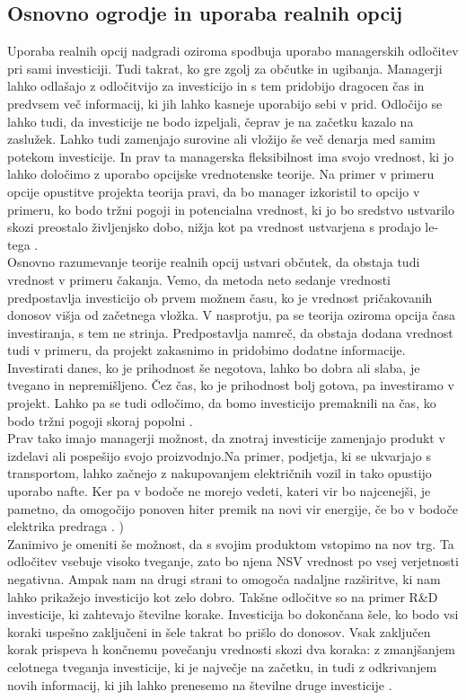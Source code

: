 \documentclass[12pt, a4paper]{amsart}
\theoremstyle{definition} %
\theoremstyle{plain} %
\begin{document}
\subsection{Osnovno ogrodje in uporaba realnih opcij}
Uporaba realnih opcij nadgradi oziroma spodbuja uporabo managerskih odločitev pri sami investiciji. Tudi takrat, ko gre zgolj za občutke in ugibanja. Managerji lahko odlašajo z odločitvijo za investicijo in s tem pridobijo dragocen čas in predvsem več informacij, ki jih lahko kasneje uporabijo sebi v prid. Odločijo se lahko tudi, da investicije ne bodo izpeljali, čeprav je na začetku kazalo na zaslužek. Lahko tudi zamenjajo surovine ali vložijo še več denarja med samim potekom investicije. In prav ta managerska fleksibilnost ima svojo vrednost, ki jo lahko določimo z uporabo opcijske vrednotenske teorije. Na primer v primeru opcije opustitve projekta teorija pravi, da bo manager izkoristil to opcijo v primeru, ko bodo tržni pogoji in potencialna vrednost, ki jo bo sredstvo ustvarilo skozi preostalo življenjsko dobo, nižja kot pa vrednost ustvarjena s prodajo le-tega \cite[str. 33]{Brach}.  \\

Osnovno razumevanje teorije realnih opcij ustvari občutek, da obstaja tudi vrednost v primeru čakanja. Vemo, da metoda neto sedanje vrednosti predpostavlja investicijo ob prvem možnem času, ko je vrednost pričakovanih donosov višja od začetnega vložka. V nasprotju, pa se teorija oziroma opcija časa investiranja, s tem ne strinja. Predpostavlja namreč, da obstaja dodana vrednost tudi v primeru, da projekt zakasnimo in pridobimo dodatne informacije. Investirati danes, ko je prihodnost še negotova, lahko bo dobra ali slaba, je tvegano in nepremišljeno. Čez čas, ko je prihodnost bolj gotova, pa investiramo v projekt. Lahko pa se tudi odločimo, da bomo investicijo premaknili na čas, ko bodo tržni pogoji skoraj popolni \cite[str. 34, 35]{Brach}. \\

Prav tako imajo managerji možnost, da znotraj investicije zamenjajo produkt v izdelavi ali pospešijo svojo proizvodnjo.Na primer, podjetja, ki se ukvarjajo s transportom, lahko začnejo z nakupovanjem električnih vozil in tako opustijo uporabo nafte. Ker pa v bodoče ne morejo vedeti, kateri vir bo najcenejši, je pametno, da omogočijo ponoven hiter premik na novi vir energije, če bo v bodoče elektrika predraga \cite[str. 37]{Brach}. )\\

Zanimivo je omeniti še možnost, da s svojim produktom vstopimo na nov trg. Ta odločitev vsebuje visoko tveganje, zato bo njena NSV vrednost po vsej verjetnosti negativna. Ampak nam na drugi strani to omogoča nadaljne razširitve, ki nam lahko prikažejo investicijo kot zelo dobro. Takšne odločitve so na primer R\&D investicije, ki zahtevajo številne korake. Investicija bo dokončana šele, ko bodo vsi koraki uspešno zaključeni in šele takrat bo prišlo do donosov. Vsak zaključen korak prispeva h končnemu povečanju vrednosti skozi dva koraka: z zmanjšanjem celotnega tveganja investicije, ki je največje na začetku, in tudi z odkrivanjem novih informacij, ki jih lahko prenesemo na številne druge investicije \cite[str. 38]{Brach}.\\
\end{document}
